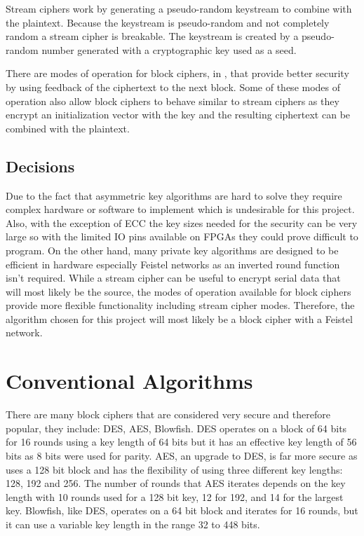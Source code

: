 \documentclass[12pt,twoside,a4paper]{report}
\begin{document}
    Stream ciphers work by generating a pseudo-random keystream to combine with the plaintext\cite{Robshaw1995}. Because the keystream is pseudo-random and not completely random a stream cipher is breakable. The keystream is created by a pseudo-random number generated with a cryptographic key used as a seed.
    
    There are modes of operation for block ciphers, in \cite{Dworkin2001}, that provide better security by using feedback of the ciphertext to the next block. Some of these modes of operation also allow block ciphers to behave similar to stream ciphers as they encrypt an initialization vector with the key and the resulting ciphertext can be combined with the plaintext.
    
    \subsection{Decisions}
    Due to the fact that asymmetric key algorithms are hard to solve they require complex hardware or software to implement which is undesirable for this project. Also, with the exception of ECC the key sizes needed for the security can be very large so with the limited IO pins available on FPGAs they could prove difficult to program. On the other hand, many private key algorithms are designed to be efficient in hardware especially Feistel networks as an inverted round function isn't required. While a stream cipher can be useful to encrypt serial data that will most likely be the source, the modes of operation available for block ciphers provide more flexible functionality including stream cipher modes. Therefore, the algorithm chosen for this project will most likely be a block cipher with a Feistel network.
    
    \section{Conventional Algorithms}
    There are many block ciphers that are considered very secure and therefore popular, they include: DES\cite{ComputerSecurityDivision1999}, AES\cite{ComputerSecurityDivision2001}, Blowfish\cite{BruceSchneier1994}.
    DES operates on a block of 64 bits for 16 rounds using a key length of 64 bits but it has an effective key length of 56 bits as 8 bits were used for parity.
    AES, an upgrade to DES, is far more secure as uses a 128 bit block and has the flexibility of using three different key lengths: 128, 192 and 256. The number of rounds that AES iterates depends on the key length with 10 rounds used for a 128 bit key, 12 for 192, and 14 for the largest key.
    Blowfish, like DES, operates on a 64 bit block and iterates for 16 rounds, but it can use a variable key length in the range 32 to 448 bits.
    
\end{document}
